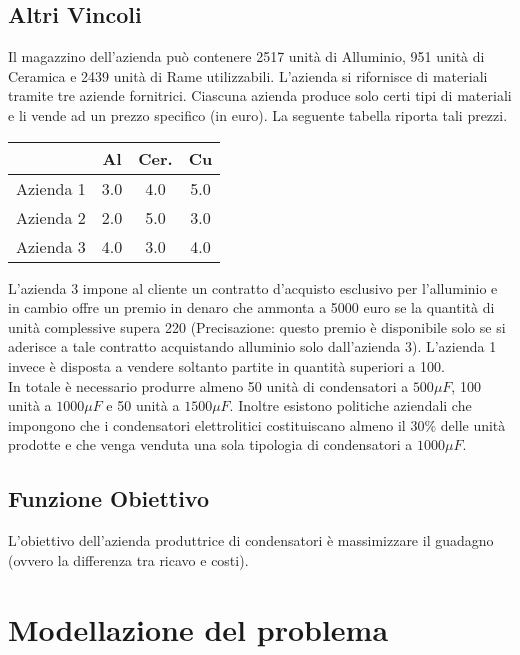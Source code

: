 \documentclass[11pt,a4paper]{article}
\begin{document}
\subsection{Altri Vincoli}
Il magazzino dell'azienda può contenere 2517 unità di Alluminio, 951 unità di Ceramica e 2439 unità di Rame utilizzabili. L'azienda si rifornisce di materiali tramite tre aziende fornitrici. Ciascuna azienda produce solo certi tipi di materiali e li vende ad un prezzo specifico (in euro). La seguente tabella riporta tali prezzi. \\
\begin{center}
\begin{tabular}{|c|c|c|c|}
\hline
           & Al & Cer. & Cu \\
\hline
Azienda 1  & 3.0  &  4.0   & 5.0  \\
\hline
Azienda 2  & 2.0  &  5.0   & 3.0  \\
\hline
Azienda 3  & 4.0  &  3.0   & 4.0  \\
\hline
\end{tabular}
\end{center}
 L'azienda 3 impone al cliente un contratto d'acquisto esclusivo per l'alluminio e in cambio offre un premio in denaro che ammonta a 5000 euro se la quantità di unità complessive supera 220 (Precisazione: questo premio è disponibile solo se si aderisce a tale contratto acquistando alluminio solo dall'azienda 3). L'azienda 1 invece è disposta a vendere soltanto partite in quantità superiori a 100. \\
 In totale è necessario produrre almeno 50 unità di condensatori a $500 \mu F$, 100 unità a $1000 \mu F$ e 50 unità a $1500 \mu F$. Inoltre esistono politiche aziendali che impongono che i condensatori elettrolitici costituiscano almeno il 30\% delle unità prodotte e che venga venduta una sola tipologia di condensatori a $1000 \mu F$.
 \subsection{Funzione Obiettivo}
 L'obiettivo dell'azienda produttrice di condensatori è massimizzare il guadagno (ovvero la differenza tra ricavo e costi). 
\section{Modellazione del problema}
\end{document}
